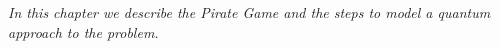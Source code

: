 
\label{cap:chapter4}

\textit{In this chapter we describe the Pirate Game and the steps to model a quantum approach to the problem. }



%
\cleardoublepage